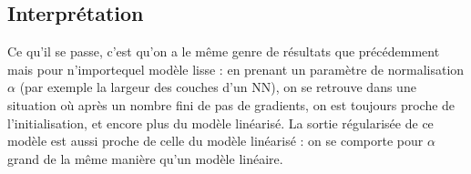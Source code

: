 \documentclass[a4paper, 11pt, french]{article}
\theoremstyle{definition}
\begin{document}
	\subsection{Interprétation}
	
	Ce qu'il se passe, c'est qu'on a le même genre de résultats que précédemment mais pour n'importequel modèle lisse : en prenant un paramètre de normalisation $\alpha$ (par exemple la largeur des couches d'un NN), on se retrouve dans une situation où après un nombre fini de pas de gradients, on est toujours proche de l'initialisation, et encore plus du modèle linéarisé. La sortie régularisée de ce modèle est aussi proche de celle du modèle linéarisé : on se comporte pour $\alpha$ grand de la même manière qu'un modèle linéaire.
\end{document}
